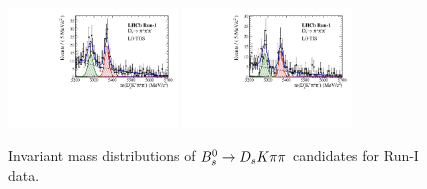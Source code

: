\begin{figure}[h]
\includegraphics[height=!,width=0.4\textwidth]{figs/MassFit/signal_Run1_pipipi_t0.pdf}
\includegraphics[height=!,width=0.4\textwidth]{figs/MassFit/signal_Run1_pipipi_t1.pdf}
\caption{Invariant mass distributions of ${{B}^0_{s}}\rightarrow{\ensuremath{{D}_{s}}} K{\pi}{\pi}$ candidates for Run-I data.}
\label{fig:massfits_signal_Run1}
\end{figure}

\clearpage

